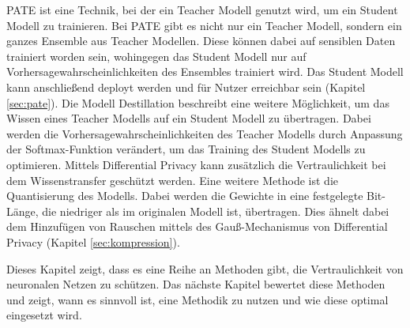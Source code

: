 PATE ist eine Technik, bei der ein Teacher Modell genutzt wird, um ein Student Modell zu trainieren.
Bei PATE gibt es nicht nur ein Teacher Modell, sondern ein ganzes Ensemble aus Teacher Modellen.
Diese können dabei auf sensiblen Daten trainiert worden sein, wohingegen das Student Modell nur auf Vorhersagewahrscheinlichkeiten des Ensembles trainiert wird.
Das Student Modell kann anschließend deployt werden und für Nutzer erreichbar sein (Kapitel \ref{sec:pate}).
Die Modell Destillation beschreibt eine weitere Möglichkeit, um das Wissen eines Teacher Modells auf ein Student Modell zu übertragen. 
Dabei werden die Vorhersagewahrscheinlichkeiten des Teacher Modells durch Anpassung der Softmax-Funktion verändert, um das Training des Student Modells zu optimieren.
Mittels Differential Privacy kann zusätzlich die Vertraulichkeit bei dem Wissenstransfer geschützt werden.
Eine weitere Methode ist die Quantisierung des Modells.
Dabei werden die Gewichte in eine festgelegte Bit-Länge, die niedriger als im originalen Modell ist, übertragen.
Dies ähnelt dabei dem Hinzufügen von Rauschen mittels des Gauß-Mechanismus von Differential Privacy (Kapitel \ref{sec:kompression}).

Dieses Kapitel zeigt, dass es eine Reihe an Methoden gibt, die Vertraulichkeit von neuronalen Netzen zu schützen.
Das nächste Kapitel bewertet diese Methoden und zeigt, wann es sinnvoll ist, eine Methodik zu nutzen und wie diese optimal eingesetzt wird.

